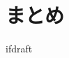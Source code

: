 \documentclass{jsarticle}
\begin{document}
    \fi
    \section{まとめ}

    \expandafter\ifx\csname ifdraft\endcsname\relax
\end{document}

